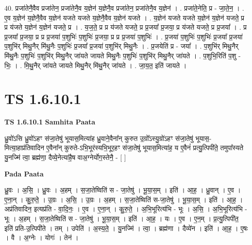 \documentclass[17pt]{extarticle}
\begin{document}
40. प्रजा॑तेनै॒वैव प्रजा॑तेन॒ प्रजा॑तेनै॒व य॒ज्ञेन॑ य॒ज्ञेनै॒व प्रजा॑तेन॒ प्रजा॑तेनै॒व य॒ज्ञेन॑ । . प्रजा॑ते॒नेति॒ प्र - जा॒ते॒न॒ । . ए॒व य॒ज्ञेन॑ य॒ज्ञेनै॒वैव य॒ज्ञेन॑ यजते यजते य॒ज्ञेनै॒वैव य॒ज्ञेन॑ यजते । . य॒ज्ञेन॑ यजते यजते य॒ज्ञेन॑ य॒ज्ञेन॑ यजते॒ प्र प्र य॑जते य॒ज्ञेन॑ य॒ज्ञेन॑ यजते॒ प्र । . य॒ज॒ते॒ प्र प्र य॑जते यजते॒ प्र प्र॒जया᳚ प्र॒जया॒ प्र य॑जते यजते॒ प्र प्र॒जया᳚ । . प्र प्र॒जया᳚ प्र॒जया॒ प्र प्र प्र॒जया॑ प॒शुभिः॑ प॒शुभिः॑ प्र॒जया॒ प्र प्र प्र॒जया॑ प॒शुभिः॑ । . प्र॒जया॑ प॒शुभिः॑ प॒शुभिः॑ प्र॒जया᳚ प्र॒जया॑ प॒शुभि॑र् मिथु॒नैर् मि॑थु॒नैः प॒शुभिः॑ प्र॒जया᳚ प्र॒जया॑ प॒शुभि॑र् मिथु॒नैः । . प्र॒जयेति॑ प्र - जया᳚ । . प॒शुभि॑र् मिथु॒नैर् मि॑थु॒नैः प॒शुभिः॑ प॒शुभि॑र् मिथु॒नैर् जा॑यते जायते मिथु॒नैः प॒शुभिः॑ प॒शुभि॑र् मिथु॒नैर् जा॑यते । . प॒शुभि॒रिति॑ प॒शु - भिः॒ । . मि॒थु॒नैर् जा॑यते जायते मिथु॒नैर् मि॑थु॒नैर् जा॑यते । . जा॒य॒त॒ इति॑ जायते । \newline
\pagebreak
{}

\section{ TS 1.6.10.1 }

\textbf{TS 1.6.10.1 } \newline
\textbf{Samhita Paata} \newline

ध्रु॒वो॑ऽसि ध्रु॒वो॑ऽहꣳ स॑जा॒तेषु॑ भूयास॒मित्या॑ह ध्रु॒वाने॒वैना᳚न् कुरुत उ॒ग्रो᳚ऽस्यु॒ग्रो॑ऽहꣳ स॑जा॒तेषु॑ भूयास॒-मित्या॒हाप्र॑तिवादिन ए॒वैना᳚न् कुरुते-ऽभि॒भूर॑स्यभि॒भूर॒हꣳ स॑जा॒तेषु॑ भूयास॒मित्या॑ह॒ य ए॒वैनं॑ प्रत्यु॒त्पिपी॑ते॒ तमुपा᳚स्यते यु॒नज्मि॑ त्वा॒ ब्रह्म॑णा॒ दैव्ये॒नेत्या॑है॒ष वाअ॒ग्नेर्योग॒स्तेनै॒ - [ ] \newline

\textbf{Pada Paata} \newline

ध्रु॒वः । अ॒सि॒ । ध्रु॒वः । अ॒हम् । स॒जा॒तेष्विति॑ स - जा॒तेषु॑ । भू॒या॒स॒म् । इति॑ । आ॒ह॒ । ध्रु॒वान् । ए॒व । ए॒ना॒न् । कु॒रु॒ते॒ । उ॒ग्रः । अ॒सि॒ । उ॒ग्रः । अ॒हम् । स॒जा॒तेष्विति॑ स-जा॒तेषु॑ । भू॒या॒स॒म् । इति॑ । आ॒ह॒ । अप्र॑तिवादिन॒ इत्यप्र॑ति - वा॒दि॒नः॒ । ए॒व । ए॒ना॒न् । कु॒रु॒ते॒ । अ॒भि॒भूरित्य॑भि - भूः । अ॒सि॒ । अ॒भि॒भूरित्य॑भि - भूः । अ॒हम् । स॒जा॒तेष्विति॑ स - जा॒तेषु॑ । भू॒या॒स॒म् । इति॑ । आ॒ह॒ । यः । ए॒व । ए॒न॒म् । प्र॒त्यु॒त्पिपी॑त॒ इति॑ प्रति-उ॒त्पिपी॑ते । तम् । उपेति॑ । अ॒स्य॒ते॒ । यु॒नज्मि॑ । त्वा॒ । ब्रह्म॑णा । दैव्ये॑न । इति॑ । आ॒ह॒ । ए॒षः । वै । अ॒ग्नेः । योगः॑ । तेन॑ ।  \newline
\end{document}
